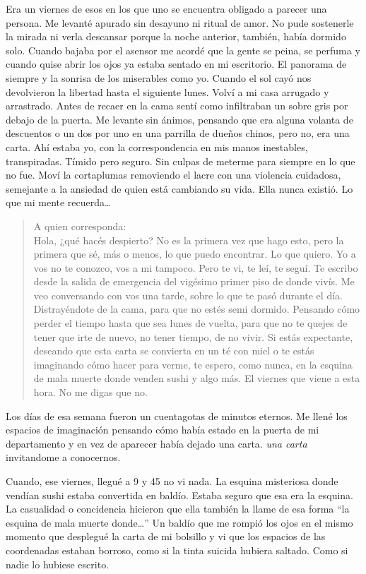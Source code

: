 
Era un viernes de esos en los que uno se encuentra obligado a parecer una
persona. Me levanté apurado sin desayuno ni ritual de amor. No pude sostenerle 
la mirada ni verla descansar porque la noche anterior, también, había dormido 
solo. Cuando bajaba por el asensor me acordé que la gente se peina, se perfuma
y cuando quise abrir los ojos ya estaba sentado en mi escritorio. El panorama
de siempre y la sonrisa de los miserables como yo. Cuando el sol cayó nos
devolvieron la libertad hasta el siguiente lunes. Volví a mi casa arrugado y
arrastrado. Antes de recaer en la cama sentí como infiltraban un sobre gris por
debajo de la puerta. Me levante sin ánimos, pensando que era alguna volanta de
descuentos o un dos por uno en una parrilla de dueños chinos, pero no, era una
carta. Ahí estaba yo, con la correspondencia en mis manos inestables, 
transpiradas. Tímido pero seguro. Sin culpas de meterme para siempre en lo que
no fue. Moví la cortaplumas removiendo el lacre con una violencia cuidadosa,
semejante a la ansiedad de quien está cambiando su vida. Ella nunca existió.
Lo que mi mente recuerda\ldots\newline

\begin{quotation}
\noindent
A quien corresponda:\\

Hola, ¿qué hacés despierto? No es la primera vez que hago esto,
pero la primera que sé, más o menos, lo que puedo encontrar. Lo que quiero. Yo
a vos no te conozco, vos a mi tampoco. Pero te vi, te leí, te seguí. Te escribo
desde la salida de emergencia del vigésimo primer piso de donde vivís. Me veo
conversando con vos una tarde, sobre lo que te pasó durante el día. 
Distrayéndote de la cama, para que no estés semi dormido. Pensando cómo perder
el tiempo hasta que sea lunes de vuelta, para que no te quejes de tener que
irte de nuevo, no tener tiempo, de no vivir. Si estás expectante, deseando que
esta carta se convierta en un té con miel o te estás imaginando cómo hacer para
verme, te espero, como nunca, en la esquina de mala muerte donde venden sushi y
algo más. El viernes que viene a esta hora. No me digas que no.
\end{quotation}

Los días de esa semana fueron un cuentagotas de minutos eternos. Me llené los
espacios de imaginación pensando cómo había estado en la puerta de mi departamento 
y en vez de aparecer había dejado una carta. \emph{una carta} invitandome a 
conocernos.

Cuando, ese viernes, llegué a 9 y 45 no vi nada. La esquina misteriosa donde
vendían sushi estaba convertida en baldío. Estaba seguro que esa era la esquina.
La casualidad o concidencia hicieron que ella también la llame de esa forma ``la
esquina de mala muerte donde\ldots'' Un baldío que me rompió los ojos en el mismo
momento que desplegué la carta de mi bolsillo y vi que los espacios de las
coordenadas estaban borroso, como si la tinta suicida hubiera saltado. Como si
nadie lo hubiese escrito.

